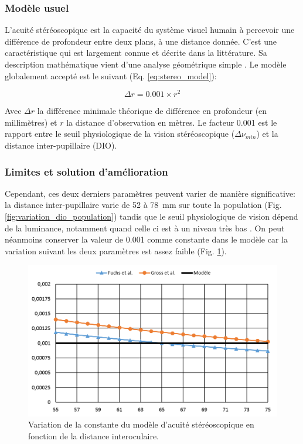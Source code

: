 	\subsubsection{Modèle usuel}	
	\par L'acuité stéréoscopique est la capacité du système visuel humain à percevoir une différence de profondeur entre deux plans, à une distance donnée. C'est une caractéristique qui est largement connue et décrite dans la littérature. Sa description mathématique vient d'une analyse géométrique simple \citep{fuchs_traite_2003,gross_human_2008}. Le modèle globalement accepté est le suivant (Eq. \ref{eq:stereo_model}):

	\begin{equation}	
		\Delta r = 0.001 \times r^2
		\label{eq:stereo_model}
	\end{equation}
	 
	\par Avec $\Delta r$ la différence minimale théorique de différence en profondeur (en millimètres) et $r$ la distance d'observation en mètres. Le facteur 0.001 est le rapport entre le seuil physiologique de la vision stéréoscopique ($\Delta \nu_{min}$) et la distance inter-pupillaire (DIO).
	
	\subsubsection{Limites et solution d'amélioration}
	\par Cependant, ces deux derniers paramètres peuvent varier de manière significative: la distance inter-pupillaire varie de 52 à 78~mm sur toute la population \citep{dodgson_variation_2004} (Fig. \ref{fig:variation_dio_population}) tandis que le seuil physiologique de vision dépend de la luminance, notamment quand celle ci est à un niveau très bas \citep{gross_human_2008}. On peut néanmoins conserver la valeur de 0.001 comme constante dans le modèle car la variation suivant les deux paramètres est assez faible (Fig. \ref{fig:variation_constante_dio}).
	
	\begin{figure}
		\centering
		\includegraphics[scale=.9]{Figures/FractionVariation}
		\caption{Variation de la constante du modèle d'acuité stéréoscopique en fonction de la distance interoculaire.}
		\label{fig:variation_constante_dio}
	\end{figure}
	

